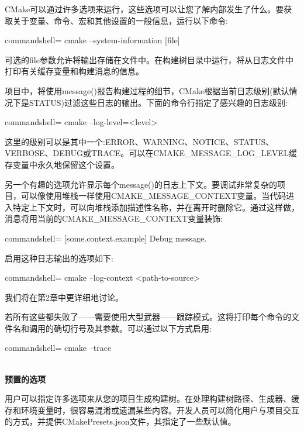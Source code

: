 CMake可以通过许多选项来运行，这些选项可以让您了解内部发生了什么。要获取关于变量、命令、宏和其他设置的一般信息，运行以下命令:

\begin{tcblisting}{commandshell={}}
cmake --system-information [file]
\end{tcblisting}

可选的file参数允许将输出存储在文件中。在构建树目录中运行，将从日志文件中打印有关缓存变量和构建消息的信息。

项目中，将使用message()报告构建过程的细节，CMake根据当前日志级别(默认情况下是STATUS)过滤这些日志的输出。下面的命令行指定了感兴趣的日志级别:

\begin{tcblisting}{commandshell={}}
cmake --log-level=<level>
\end{tcblisting}

这里的级别可以是其中一个:ERROR、WARNING、NOTICE、STATUS、VERBOSE、DEBUG或TRACE。可以在CMAKE\_MESSAGE\_LOG\_LEVEL缓存变量中永久地保留这个设置。

另一个有趣的选项允许显示每个message()的日志上下文。要调试非常复杂的项目，可以像使用堆栈一样使用CMAKE\_MESSAGE\_CONTEXT变量。当代码进入特定上下文时，可以向堆栈添加描述性名称，并在离开时删除它。通过这样做，消息将用当前的CMAKE\_MESSAGE\_CONTEXT变量装饰:

\begin{tcblisting}{commandshell={}}
[some.context.example] Debug message.
\end{tcblisting}

启用这种日志输出的选项如下:

\begin{tcblisting}{commandshell={}}
cmake --log-context <path-to-source>
\end{tcblisting}

我们将在第2章中更详细地讨论。

若所有这些都失败了——需要使用大型武器——跟踪模式。这将打印每个命令的文件名和调用的确切行号及其参数。可以通过以下方式启用:

\begin{tcblisting}{commandshell={}}
cmake --trace
\end{tcblisting}

\hspace*{\fill} \\ %
\noindent
\textbf{预置的选项}

用户可以指定许多选项来从您的项目生成构建树。在处理构建树路径、生成器、缓存和环境变量时，很容易混淆或遗漏某些内容。开发人员可以简化用户与项目交互的方式，并提供CMakePresets.json文件，其指定了一些默认值。

